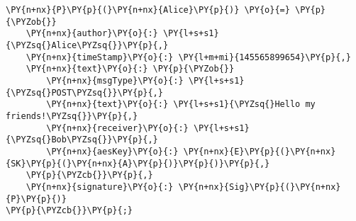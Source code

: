 \begin{Verbatim}[commandchars=\\\{\},codes={\catcode`\$=3\catcode`\^=7\catcode`\_=8}]
\PY{n+nx}{P}\PY{p}{(}\PY{n+nx}{Alice}\PY{p}{)} \PY{o}{=} \PY{p}{\PYZob{}}
    \PY{n+nx}{author}\PY{o}{:} \PY{l+s+s1}{\PYZsq{}Alice\PYZsq{}}\PY{p}{,}
    \PY{n+nx}{timeStamp}\PY{o}{:} \PY{l+m+mi}{145565899654}\PY{p}{,}
    \PY{n+nx}{text}\PY{o}{:} \PY{p}{\PYZob{}}
        \PY{n+nx}{msgType}\PY{o}{:} \PY{l+s+s1}{\PYZsq{}POST\PYZsq{}}\PY{p}{,}
        \PY{n+nx}{text}\PY{o}{:} \PY{l+s+s1}{\PYZsq{}Hello my friends!\PYZsq{}}\PY{p}{,}
        \PY{n+nx}{receiver}\PY{o}{:} \PY{l+s+s1}{\PYZsq{}Bob\PYZsq{}}\PY{p}{,}
        \PY{n+nx}{aesKey}\PY{o}{:} \PY{n+nx}{E}\PY{p}{(}\PY{n+nx}{SK}\PY{p}{(}\PY{n+nx}{A}\PY{p}{)}\PY{p}{)}\PY{p}{,}
    \PY{p}{\PYZcb{}}\PY{p}{,}
    \PY{n+nx}{signature}\PY{o}{:} \PY{n+nx}{Sig}\PY{p}{(}\PY{n+nx}{P}\PY{p}{)}
\PY{p}{\PYZcb{}}\PY{p}{;}
\end{Verbatim}
